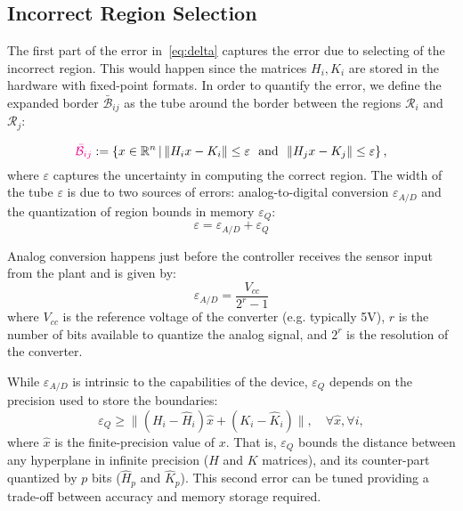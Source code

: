 \subsection{Incorrect Region Selection}

The first part of the error in~\autoref{eq:delta} captures the error due to
selecting of the incorrect region.
This would happen since the matrices $H_i,K_i$ are stored in the hardware with fixed-point formats. In order to quantify the error, we define the expanded border $\bar{\mathcal B}_{ij}$ as the tube around the border between the regions $\mathcal{R}_i$ and $\mathcal{R}_j$:

\begin{equation*}
\textcolor{magenta}{\bar{\mathcal B}_{ij}} := \left\{x\in\mathbb R^n\,|\, \| H_i x - K_i\| \le \varepsilon\,\, \text{ and }\,\, \| H_j x - K_j\| \le \varepsilon \right\},
\end{equation*}
where $\varepsilon$ captures the uncertainty in computing the correct region.
%
The width of the tube $\varepsilon$ is due to two sources of errors:
analog-to-digital conversion $\varepsilon_{A/D}$ and the quantization of region
bounds in memory $\varepsilon_{Q}$:
\begin{equation}\label{eq:epsilontot}
  \varepsilon=\varepsilon_{A/D}+\varepsilon_{Q}
\end{equation}

Analog conversion happens just before the controller receives the sensor input from the plant
and is given by:
\begin{equation*}
\varepsilon_{A/D}=\frac{V_{cc}}{2^{r}-1}
\end{equation*}
where $V_{cc}$ is the reference voltage of the converter (e.g. typically 5V), $r$
is the number of bits available to quantize the analog signal, and $2^{r}$ is
the resolution of the converter.

While $\varepsilon_{A/D}$ is intrinsic to the capabilities of the device,
$\varepsilon_{Q}$ depends on the precision used to store the boundaries:
\begin{equation}\label{eq:quantizationlines}
  \varepsilon_{Q} \ge  \|(H_i - \hat{H}_i) \hat{x} + (K_i - \hat{K}_i)\|, \quad \forall \hat{x},\forall i,
\end{equation}
where $\hat{x}$ is the finite-precision value of $x$.
That is, $\varepsilon_{Q}$ bounds the distance between any hyperplane in infinite
precision ($H$ and $K$ matrices), and its counter-part quantized by $p$ bits 
($\hat{H}_{p}$ and $\hat{K}_{p}$).
This second error can be tuned providing a trade-off between accuracy and
memory storage required.

